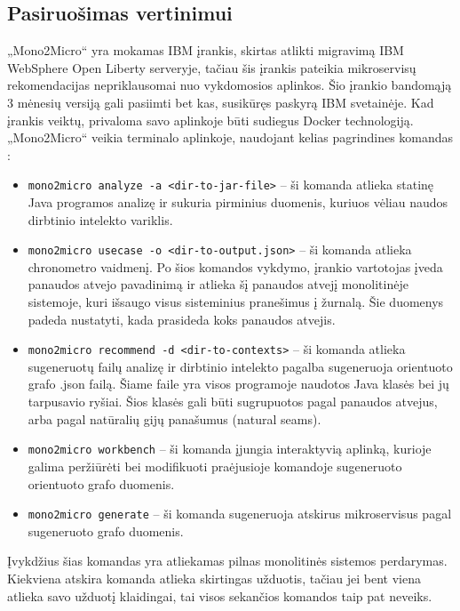 \documentclass{VUMIFPSbakalaurinis}
\begin{document}
\subsection{Pasiruošimas vertinimui}
„Mono2Micro“ yra mokamas IBM įrankis, skirtas atlikti migravimą IBM WebSphere Open Liberty serveryje, tačiau šis įrankis pateikia mikroservisų rekomendacijas nepriklausomai nuo vykdomosios aplinkos. Šio įrankio bandomąją 3 mėnesių versiją gali pasiimti bet kas, susikūręs paskyrą IBM svetainėje. Kad įrankis veiktų, privaloma savo aplinkoje būti sudiegus Docker technologiją. „Mono2Micro“ veikia terminalo aplinkoje, naudojant kelias pagrindines komandas \cite{IBMM2M}:
\begin{itemize}
    \item \verb|mono2micro analyze -a <dir-to-jar-file>| -- ši komanda atlieka statinę Java programos analizę ir sukuria pirminius duomenis, kuriuos vėliau naudos dirbtinio intelekto variklis.

    \item \verb|mono2micro usecase -o <dir-to-output.json>| -- ši komanda atlieka chronometro vaidmenį. Po šios komandos vykdymo, įrankio vartotojas įveda panaudos atvejo pavadinimą ir atlieka šį panaudos atvejį monolitinėje sistemoje, kuri išsaugo visus sisteminius pranešimus į žurnalą. Šie duomenys padeda nustatyti, kada prasideda koks panaudos atvejis.

    \item \verb|mono2micro recommend -d <dir-to-contexts>| -- ši komanda atlieka sugeneruotų failų analizę ir dirbtinio intelekto pagalba sugeneruoja orientuoto grafo .json failą. Šiame faile yra visos programoje naudotos Java klasės bei jų tarpusavio ryšiai. Šios klasės gali būti sugrupuotos pagal panaudos atvejus, arba pagal natūralių gijų panašumus (natural seams).

    \item \verb|mono2micro workbench| -- ši komanda įjungia interaktyvią aplinką, kurioje galima peržiūrėti bei modifikuoti praėjusioje komandoje sugeneruoto orientuoto grafo duomenis.

    \item \verb|mono2micro generate| -- ši komanda sugeneruoja atskirus mikroservisus pagal sugeneruoto grafo duomenis.
\end{itemize}

Įvykdžius šias komandas yra atliekamas pilnas monolitinės sistemos perdarymas. Kiekviena atskira komanda atlieka skirtingas užduotis, tačiau jei bent viena atlieka savo užduotį klaidingai, tai visos sekančios komandos taip pat neveiks. 
\end{document}
